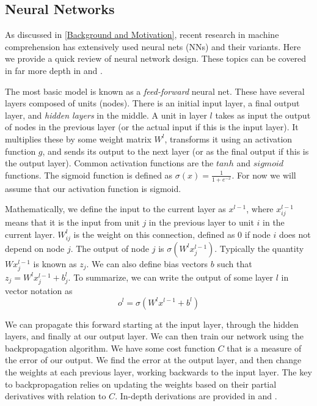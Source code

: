 \documentclass[pageno]{jpaper}
\begin{document}
\subsection{Neural Networks}
\label{Neural Networks}

As discussed in \ref{Background and Motivation}, recent research in machine
comprehension has extensively used neural nets (NNs) and their variants. Here we
provide a quick review of neural network design. These topics can be covered in
far more depth in \cite{Bishop1995} and \cite{Nielsen2015}.

The most basic model is known as a \textit{feed-forward} neural net. These have
several layers composed of units (nodes). There is an initial input layer, a
final output layer, and \textit{hidden layers} in the middle. A unit in layer
$l$ takes as input the output of nodes in the previous layer (or the actual
input if this is the input layer). It multiplies these by some weight matrix
$W^l$, transforms it using an activation function $g$, and sends its output to the
next layer (or as the final output if this is the output layer). Common
activation functions are the $tanh$ and $sigmoid$ functions. The sigmoid
function is defined as $\sigma (x) = \frac{1}{1+e^{-x}}$. For now we will assume
that our activation function is sigmoid.

Mathematically, we define the input to the current layer as $x^{l-1}$,
where $x^{l-1}_{ij}$ means that it is the input from unit $j$ in the previous
layer to unit $i$ in the current layer. $W^l_{ij}$ is the weight on this
connection, defined as 0 if node $i$ does not depend on node $j$. The output of
node $j$ is $\sigma ( W^l x^{l-1}_j)$. Typically the quantity $Wx^{l-1}_j$ is
known as $z_j$. We can also define bias vectors $b$ such that $z_j =
W^lx^{l-1}_j + b^l_j$. To summarize, we can write the output of some layer $l$
in vector notation as
$$o^l = \sigma(W^lx^{l-1} + b^l)$$

We can propagate this forward starting at the input layer, through the hidden
layers, and finally at our output layer. We can then train our network using the
backpropagation algorithm. We have some cost function $C$ that is a measure of
the error of our output. We find the error at the output layer, and then change
the weights at each previous layer, working backwards to the input layer. The
key to backpropagation relies on updating the weights based on their partial
derivatives with relation to $C$. In-depth derivations are provided in
\cite{Bishop1995} and \cite{Nielsen2015}.\\
\end{document}
